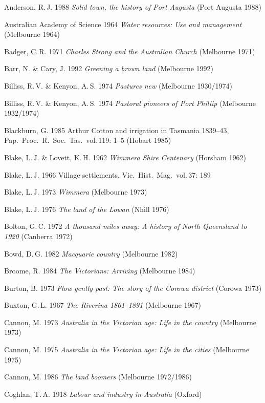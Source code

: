 Anderson, R.\,J. 1988 \textsl{Solid town, the history of Port Augusta}
(Port Augusta 1988)

Australian Academy of Science 1964 \textsl{Water resources: Use and
management} (Melbourne 1964)

Badger, C.\,R. 1971 \textsl{Charles Strong and the Australian Church}
(Melbourne 1971)

Barr, N. \& Cary, J. 1992 \textsl{Greening a brown land} (Melbourne
1992)

Billiss, R.\,V. \& Kenyon, A.\,S. 1974 \textsl{Pastures new}
(Melbourne 1930/1974)

Billiss, R.\,V. \& Kenyon, A.\,S. 1974 \textsl{Pastoral pioneers of
Port Phillip} (Melbourne 1932/1974)

Blackburn, G. 1985 Arthur Cotton and irrigation in Tasmania 1839--43,
Pap.\ Proc.\ R.~Soc.\ Tas.\ vol.\,119: 1--5 (Hobart 1985)

Blake, L.\,J. \& Lovett, K.\,H. 1962 \textsl{Wimmera Shire Centenary}
(Horsham 1962)

Blake, L.\,J. 1966 Village settlements, Vic.\ Hist.\ Mag.\ vol.\,37: 189

Blake, L.\,J. 1973 \textsl{Wimmera} (Melbourne 1973)

Blake, L.\,J. 1976 \textsl{The land of the Lowan} (Nhill 1976)

Bolton, G.\,C. 1972 \textsl{A thousand miles away: A history of North
Queensland to 1920} (Canberra 1972)

Bowd, D.\,G. 1982 \textsl{Macquarie country} (Melbourne 1982)

Broome, R. 1984 \textsl{The Victorians: Arriving} (Melbourne 1984)

Burton, B.  1973 \textsl{Flow gently past: The story of the Corowa
district} (Corowa 1973)

Buxton, G.\,L. 1967 \textsl{The Riverina 1861--1891} (Melbourne 1967)

Cannon, M. 1973 \textsl{Australia in the Victorian age: Life in the country}
(Melbourne 1973)

Cannon, M. 1975 \textsl{Australia in the Victorian age: Life in the
cities} (Melbourne 1975)

Cannon, M. 1986 \textsl{The land boomers} (Melbourne 1972/1986)

Coghlan, T.\,A. 1918 \textsl{Labour and industry in Australia} (Oxford)

